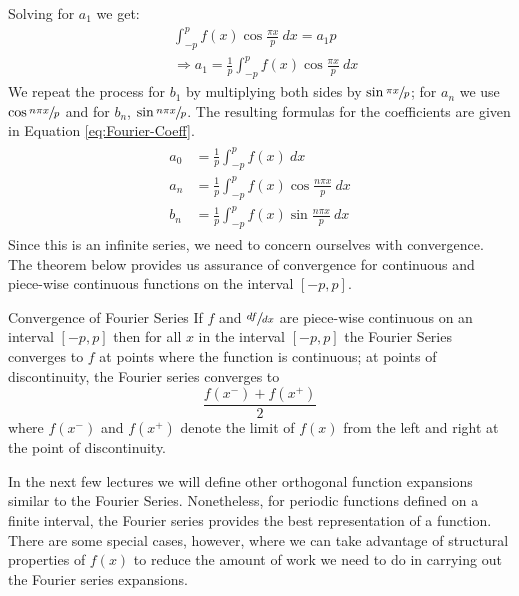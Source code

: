 Solving for $a_1$ we get:
\begin{align*}
&\int_{-p}^{p} f(x)\cos{\frac{\pi x}{p}} \ dx =a_1 p \\
& \Rightarrow a_1 = \frac{1}{p}\int_{-p}^{p} f(x)\cos{\frac{\pi x}{p}} \ dx
\end{align*}
We repeat the process for $b_1$ by multiplying both sides by $\sin{\sfrac{\pi x}{p}}$; for $a_n$ we use $\cos{\sfrac{n \pi x}{p}}$ and for $b_n$, $\sin{\sfrac{n \pi x}{p}}$.  The resulting formulas for the coefficients are given in Equation \ref{eq:Fourier-Coeff}.
\begin{align}
\begin{split}
a_0 &= \frac{1}{p}\int_{-p}^{p} f(x) \ dx \\
a_n &= \frac{1}{p}\int_{-p}^{p} f(x) \cos{\frac{n \pi x}{p}} \ dx \\
b_n &= \frac{1}{p}\int_{-p}^{p} f(x) \sin{\frac{n \pi x}{p}} \ dx 
\end{split}
\label{eq:Fourier-Coeff}
\end{align}
Since this is an infinite series, we need to concern ourselves with convergence.  The theorem below provides us assurance of convergence for continuous and piece-wise continuous functions on the interval $[-p,p]$.  
\begin{theorem}{Convergence of Fourier Series}
If $f$ and $\sfrac{df}{dx}$ are piece-wise continuous on an interval $[-p,p]$ then for all $x$ in the interval $[-p,p]$ the Fourier Series converges to $f$ at points where the function is continuous; at points of discontinuity, the Fourier series converges to 
\begin{equation*}
\frac{f(x^{-}) + f(x^+)}{2}
\end{equation*}
where $f(x^-)$ and $f(x^+)$ denote the limit of $f(x)$ from the left and right at the point of discontinuity.
\end{theorem}
In the next few lectures we will define other orthogonal function expansions similar to the Fourier Series.  Nonetheless, for periodic functions defined on a finite interval, the Fourier series provides the best representation of a function.  There are some special cases, however, where we can take advantage of structural properties of $f(x)$ to reduce the amount of work we need to do in carrying out the Fourier series expansions.

